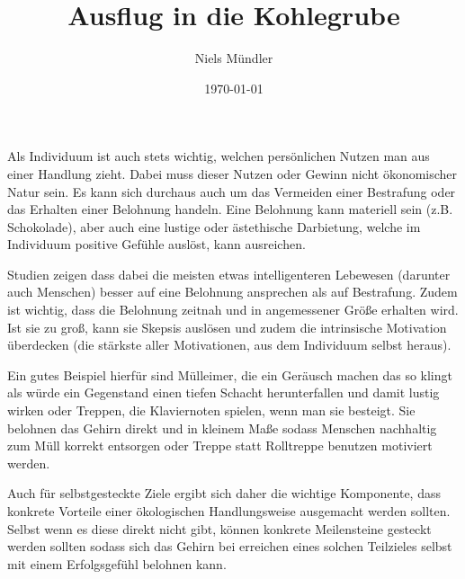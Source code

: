 \documentclass{article}
\title{Ausflug in die Kohlegrube}
\author{Niels Mündler}
\date{\today}
\begin{document}
\maketitle

Als Individuum ist auch stets wichtig, welchen persönlichen Nutzen man aus einer Handlung zieht.
Dabei muss dieser Nutzen oder Gewinn nicht ökonomischer Natur sein.
Es kann sich durchaus auch um das Vermeiden einer Bestrafung oder das Erhalten einer Belohnung handeln.
Eine Belohnung kann materiell sein (z.B. Schokolade), aber
auch eine lustige oder ästethische Darbietung, welche im Individuum positive Gefühle auslöst, kann ausreichen.

Studien zeigen dass dabei die meisten etwas intelligenteren Lebewesen (darunter auch Menschen) besser auf 
eine Belohnung ansprechen als auf Bestrafung.
Zudem ist wichtig, dass die Belohnung zeitnah und in angemessener Größe erhalten wird.
Ist sie zu groß, kann sie Skepsis auslösen und zudem die intrinsische Motivation überdecken (die stärkste aller Motivationen, aus dem Individuum selbst heraus).

Ein gutes Beispiel hierfür sind Mülleimer, die ein Geräusch machen das so klingt als würde ein Gegenstand einen
tiefen Schacht herunterfallen und damit lustig wirken oder Treppen, die Klaviernoten spielen, wenn man sie besteigt.
Sie belohnen das Gehirn direkt und in kleinem Maße sodass Menschen nachhaltig zum Müll korrekt entsorgen oder 
Treppe statt Rolltreppe benutzen motiviert werden.

Auch für selbstgesteckte Ziele ergibt sich daher die wichtige Komponente, dass konkrete Vorteile einer ökologischen Handlungsweise
ausgemacht werden sollten.
Selbst wenn es diese direkt nicht gibt, können konkrete Meilensteine gesteckt werden sollten sodass sich das Gehirn bei erreichen
eines solchen Teilzieles selbst mit einem Erfolgsgefühl belohnen kann.
\end{document}
